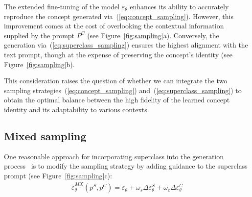 The extended fine-tuning of the model \(\varepsilon_{\theta}\) enhances its ability to accurately reproduce the concept generated via~(\ref{eq:concept_sampling}). However, this improvement comes at the cost of overlooking the contextual information supplied by the prompt $P^C$ (see Figure~\ref{fig:sampling}a). Conversely, the generation via~(\ref{eq:superclass_sampling}) ensures the highest alignment with the text prompt, though at the expense of preserving the concept's identity (see Figure~\ref{fig:sampling}b).


This consideration raises the question of whether we can integrate the two sampling strategies~(\ref{eq:concept_sampling}) and~(\ref{eq:superclass_sampling}) to obtain the optimal balance between the high fidelity of the learned concept identity and its adaptability to various contexts.

\subsection{Mixed sampling} \label{sec:mixed_sampling}
One reasonable approach for incorporating superclass into the generation process~\citep{profusion} is to modify the sampling strategy by adding guidance to the superclass prompt (see Figure~\ref{fig:sampling}c):
\begin{align}\label{eq:mixed_sampling}
    \tilde{\varepsilon}^{MX}_{\theta}(p^S, p^C) = \varepsilon_{\theta} + \omega_s \Delta\varepsilon_{\theta}^{S} + \omega_c\Delta\varepsilon_{\theta}^{C}
\end{align}

